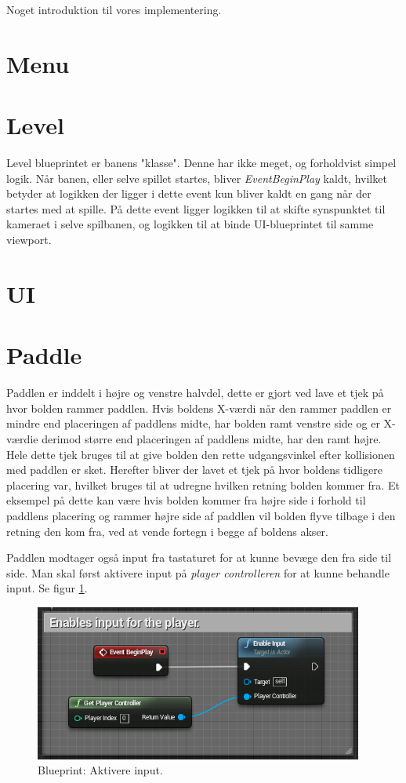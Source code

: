 Noget introduktion til vores implementering.

\section{Menu}


\section{Level}
Level blueprintet er banens "klasse". Denne har ikke meget, og forholdvist simpel logik. Når banen, eller selve spillet startes, bliver \textit{EventBeginPlay} kaldt, hvilket betyder at logikken der ligger i dette event kun bliver kaldt en gang når der startes med at spille. På dette event ligger logikken til at skifte synspunktet til kameraet i selve spilbanen, og logikken til at binde UI-blueprintet til samme viewport.

\section{UI}


\section{Paddle}
Paddlen er inddelt i højre og venstre halvdel, dette er gjort ved lave et tjek på hvor bolden rammer paddlen. Hvis boldens X-værdi når den rammer paddlen er mindre end placeringen af paddlens midte, har bolden ramt venstre side og er X-værdie derimod større end placeringen af paddlens midte, har den ramt højre. Hele dette tjek bruges til at give bolden den rette udgangsvinkel efter kollisionen med paddlen er sket. Herefter bliver der lavet et tjek på hvor boldens tidligere placering var, hvilket bruges til at udregne hvilken retning bolden kommer fra. Et eksempel på dette kan være hvis bolden kommer fra højre side i forhold til paddlens placering og rammer højre side af paddlen vil bolden flyve tilbage i den retning den kom fra, ved at vende fortegn i begge af boldens akser.

Paddlen modtager også input fra tastaturet for at kunne bevæge den fra side til side. Man skal først aktivere input på \textit{player controlleren} for at kunne behandle input. Se figur \ref{dia:paddleenableinput}. 

\begin{figure}
	\begin{center}
		\caption{Blueprint: Aktivere input.}
		\label{dia:paddleenableinput}
		\includegraphics[width=0.80\linewidth]{pictures/blueprints/paddle-enable-input}
		\end{center}
\end{figure}

